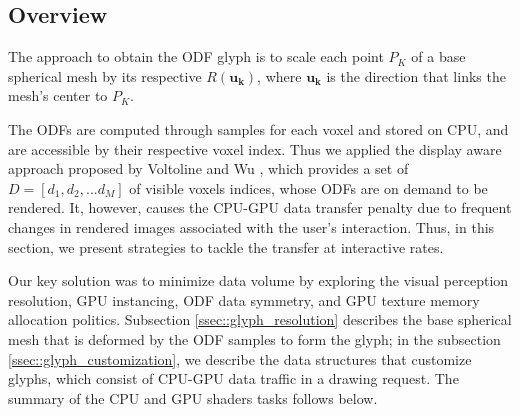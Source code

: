 \documentclass[twoside,twocolumn,10pt]{article}
\begin{document}
\subsection{Overview}

The approach to obtain the ODF glyph is to scale each point $P_K$ of a base spherical mesh by its respective $R(\bm{u_k})$, where $\bm{u_k}$ is the direction that links the mesh's center to $P_K$.

The ODFs are computed through samples for each voxel and stored on CPU, and are accessible by their respective voxel index. Thus we applied the display aware approach proposed by Voltoline and Wu \cite{voltoline2021}, which provides a set of $D = [d_1, d_2, ... d_M]$ of visible voxels indices, whose ODFs are on demand to be rendered. It, however, causes the CPU-GPU data transfer penalty due to frequent changes in rendered images associated with the user's interaction. Thus, in this section, we present strategies to tackle the transfer at interactive rates.


Our key solution was to minimize data volume by exploring the visual perception resolution, GPU instancing, ODF data symmetry, and GPU texture memory allocation politics. Subsection \ref{ssec::glyph_resolution} describes the base spherical mesh that is deformed by the ODF samples to form the glyph; in the subsection \ref{ssec::glyph_customization}, we describe the data structures that customize glyphs, which consist of CPU-GPU data traffic in a drawing request. The summary of the CPU and GPU shaders tasks follows below.







\end{document}
